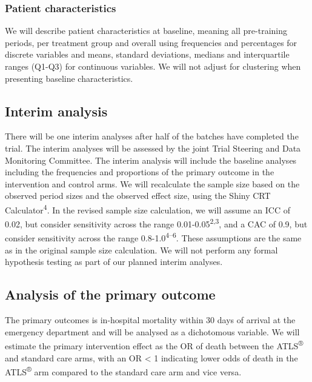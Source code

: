 \documentclass[
]{scrartcl}
\begin{document}
\hypertarget{patient-characteristics}{%
\subsubsection{Patient characteristics}\label{patient-characteristics}}

We will describe patient characteristics at baseline, meaning all
pre-training periods, per treatment group and overall using frequencies
and percentages for discrete variables and means, standard deviations,
medians and interquartile ranges (Q1-Q3) for continuous variables. We
will not adjust for clustering when presenting baseline characteristics.

\hypertarget{interim-analysis}{%
\subsection{Interim analysis}\label{interim-analysis}}

There will be one interim analyses after half of the batches have
completed the trial. The interim analyses will be assessed by the joint
Trial Steering and Data Monitoring Committee. The interim analysis will
include the baseline analyses including the frequencies and proportions
of the primary outcome in the intervention and control arms. We will
recalculate the sample size based on the observed period sizes and the
observed effect size, using the Shiny CRT Calculator\textsuperscript{4}.
In the revised sample size calculation, we will assume an ICC of 0.02,
but consider sensitivity across the range
0.01-0.05\textsuperscript{2,3}, and a CAC of 0.9, but consider
sensitivity across the range 0.8-1.0\textsuperscript{4--6}. These
assumptions are the same as in the original sample size calculation. We
will not perform any formal hypothesis testing as part of our planned
interim analyses.

\hypertarget{analysis-of-the-primary-outcome}{%
\subsection{Analysis of the primary
outcome}\label{analysis-of-the-primary-outcome}}

The primary outcomes is in-hospital mortality within 30 days of arrival
at the emergency department and will be analysed as a dichotomous
variable. We will estimate the primary intervention effect as the OR of
death between the ATLS\textsuperscript{®} and standard care arms, with
an OR \textless{} 1 indicating lower odds of death in the
ATLS\textsuperscript{®} arm compared to the standard care arm and vice
versa.
\end{document}
